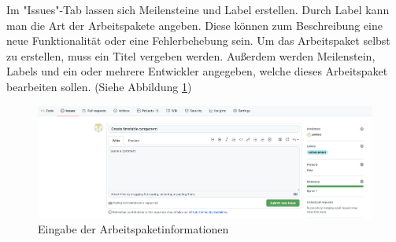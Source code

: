 
Im "Issues"-Tab lassen sich Meilensteine und Label erstellen. Durch Label kann man die Art der Arbeitspakete angeben. Diese können zum Beschreibung eine neue Funktionalität oder eine Fehlerbehebung sein. Um das Arbeitspaket selbst zu erstellen, muss ein Titel vergeben werden. Außerdem werden Meilenstein, Labels und ein oder mehrere Entwickler angegeben, welche dieses Arbeitspaket bearbeiten sollen. (Siehe Abbildung \ref{fig:createIssue})

\begin{figure}[H]
    \centering
    \includegraphics[width=\textwidth]{media/ProjectManagement/CreateIssue.png}
    \caption{Eingabe der Arbeitspaketinformationen}
    \label{fig:createIssue}
\end{figure}



\cite{GithubFS}